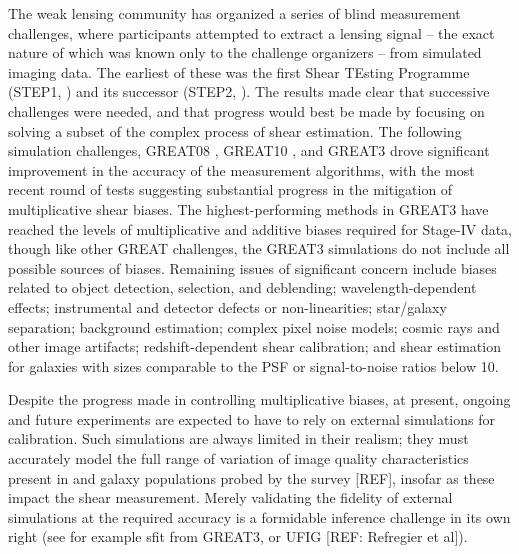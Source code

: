 \documentclass[iop]{emulateapj}
\begin{document}
The weak lensing community has organized a series of blind measurement challenges, where
participants attempted to extract a lensing signal -- the exact nature of which was known only to
the challenge organizers -- from simulated imaging data. The earliest of these was the first Shear
TEsting Programme (STEP1, \citealt{2006MNRAS.368.1323H}) and its successor (STEP2, \citealt{2007MNRAS.376...13M}). The results made clear that
successive challenges were needed, and that progress would best be made by focusing on solving a
subset of the complex process of shear estimation. The following simulation challenges, GREAT08
\citep{2009AnApS...3....6B,2010MNRAS.405.2044B}, GREAT10 \citep{2010arXiv1009.0779K,2012MNRAS.423.3163K}, and GREAT3 \citep{2014ApJS..212....5M,2015MNRAS.450.2963M} drove significant improvement in the accuracy of the
measurement algorithms, with the most recent round of tests suggesting substantial progress in the
mitigation of multiplicative shear biases.  The highest-performing methods in GREAT3 have reached
the levels of multiplicative and additive biases required for Stage-IV data, though like other GREAT
challenges, the GREAT3
simulations do not include all possible sources of biases.  Remaining issues of significant concern
include biases related to object detection, selection, and deblending; wavelength-dependent
effects; instrumental and detector defects or non-linearities; star/galaxy separation;
background estimation; complex pixel noise models; cosmic rays and
other image artifacts; redshift-dependent
shear calibration; and shear estimation for galaxies with sizes comparable
to the PSF or signal-to-noise ratios below 10.

Despite the progress made in controlling multiplicative biases, at present, ongoing and future experiments are expected to have to rely on external simulations for calibration. Such simulations are always limited in their realism; they must accurately model the full range of variation of image quality characteristics present in and galaxy populations probed by the survey [REF], insofar as these impact the shear measurement. Merely validating the fidelity of external simulations at the required accuracy is a formidable inference challenge in its own right (see for example sfit from GREAT3, or UFIG [REF: Refregier et al]).
\end{document}
